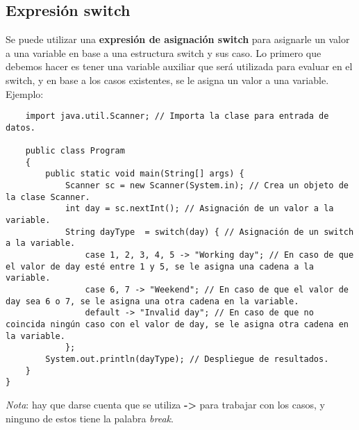 \subsection{Expresión switch}

Se puede utilizar una \textbf{expresión de asignación switch} para asignarle un valor a una variable en base a una estructura switch y sus caso. Lo primero que debemos hacer es tener una variable auxiliar que será utilizada para evaluar en el switch, y en base a los casos existentes, se le asigna un valor a una variable. Ejemplo:
\begin{lstlisting}
    import java.util.Scanner; // Importa la clase para entrada de datos.
    
    public class Program
    {
        public static void main(String[] args) {
            Scanner sc = new Scanner(System.in); // Crea un objeto de la clase Scanner.
            int day = sc.nextInt(); // Asignación de un valor a la variable.
            String dayType  = switch(day) { // Asignación de un switch a la variable.
                case 1, 2, 3, 4, 5 -> "Working day"; // En caso de que el valor de day esté entre 1 y 5, se le asigna una cadena a la variable.
                case 6, 7 -> "Weekend"; // En caso de que el valor de day sea 6 o 7, se le asigna una otra cadena en la variable.
                default -> "Invalid day"; // En caso de que no coincida ningún caso con el valor de day, se le asigna otra cadena en la variable.
            };
        System.out.println(dayType); // Despliegue de resultados.
    }
} 
\end{lstlisting}

\textit{Nota}: hay que darse cuenta que se utiliza \textbf{->} para trabajar con los casos, y ninguno de estos tiene la palabra \textit{break}.
